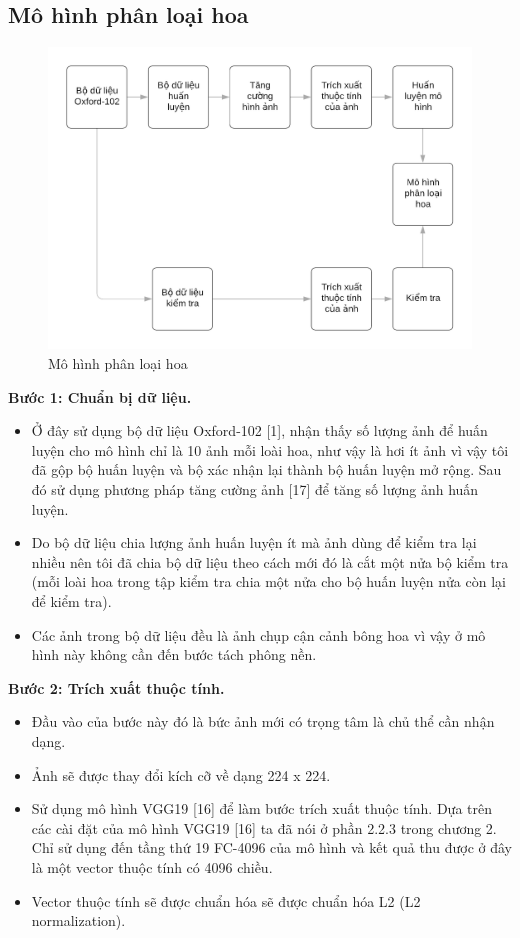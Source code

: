 \documentclass[12pt]{report}
\begin{document}
						
		\newpage
		\subsection{Mô hình phân loại hoa}
		\begin{figure}[h]
			\centering
			\includegraphics[scale=0.4]{mohinh_phanloai}
			\caption{Mô hình phân loại hoa}
			\label{fig:mohinh_phanloai}
		\end{figure}
						
		\textbf{Bước 1: Chuẩn bị dữ liệu.} 
		\begin{itemize}
			\item Ở đây sử dụng bộ dữ liệu Oxford-102 [1], nhận thấy số lượng ảnh để huấn luyện cho mô hình chỉ là 10 ảnh mỗi loài hoa, như vậy là hơi ít ảnh vì vậy tôi đã gộp bộ huấn luyện và bộ xác nhận lại thành bộ huấn luyện mở rộng. Sau đó sử dụng phương pháp tăng cường ảnh [17] để tăng số lượng ảnh huấn luyện.
			\item Do bộ dữ liệu chia lượng ảnh huấn luyện ít mà ảnh dùng để kiểm tra lại nhiều nên tôi đã chia bộ dữ liệu theo cách mới đó là cắt một nửa bộ kiểm tra (mỗi loài hoa trong tập kiểm tra chia một nửa cho bộ huấn luyện nửa còn lại để kiểm tra).
			\item Các ảnh trong bộ dữ liệu đều là ảnh chụp cận cảnh bông hoa vì vậy ở mô hình này không cần đến bước tách phông nền.
		\end{itemize}
						
		\textbf{Bước 2: Trích xuất thuộc tính.} 
		\begin{itemize}
			\item Đầu vào của bước này đó là bức ảnh mới có trọng tâm là chủ thể cần nhận dạng.
			\item Ảnh sẽ được thay đổi kích cỡ về dạng 224 x 224.
			\item Sử dụng mô hình VGG19 [16] để làm bước trích xuất thuộc tính. Dựa trên các cài đặt của mô hình VGG19 [16] ta đã nói ở phần 2.2.3 trong chương 2. Chỉ sử dụng đến tầng thứ 19 FC-4096 của mô hình và kết quả thu được ở đây là một vector thuộc tính có 4096 chiều.
			\item Vector thuộc tính sẽ được chuẩn hóa sẽ được chuẩn hóa L2 (L2 normalization).
		\end{itemize}
						
\end{document}
